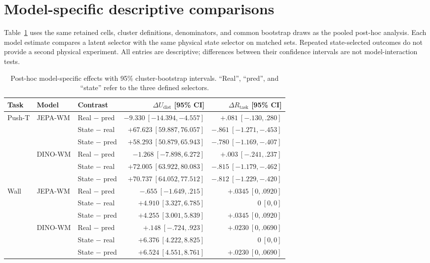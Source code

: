 \section{Model-specific descriptive comparisons}
\label{app:models}

Table~\ref{tab:models} uses the same retained cells, cluster definitions,
denominators, and common bootstrap draws as the pooled post-hoc analysis.
Each model estimate compares a latent selector with the same physical state
selector on matched sets. Repeated state-selected outcomes do not provide a
second physical experiment. All entries are descriptive; differences between
their confidence intervals are not model-interaction tests.

\begin{table}[h]
\caption{Post-hoc model-specific effects with 95\% cluster-bootstrap
intervals. ``Real'', ``pred'', and ``state'' refer to the three defined selectors.}
\label{tab:models}
\centering\small
\begin{tabular}{lllrr}
\toprule
Task & Model & Contrast & $\Delta U_{\mathrm{dist}}$ [95\% CI] & $\Delta R_{\mathrm{task}}$ [95\% CI]\\
\midrule
Push-T & JEPA-WM & Real $-$ pred & $-9.330\ [-14.394,-4.557]$ & $+.081\ [-.130,.280]$\\
 & & State $-$ real & $+67.623\ [59.887,76.057]$ & $-.861\ [-1.271,-.453]$\\
 & & State $-$ pred & $+58.293\ [50.879,65.943]$ & $-.780\ [-1.169,-.407]$\\
 & DINO-WM & Real $-$ pred & $-1.268\ [-7.898,6.272]$ & $+.003\ [-.241,.237]$\\
 & & State $-$ real & $+72.005\ [63.922,80.083]$ & $-.815\ [-1.179,-.462]$\\
 & & State $-$ pred & $+70.737\ [64.052,77.512]$ & $-.812\ [-1.229,-.420]$\\
\addlinespace
Wall & JEPA-WM & Real $-$ pred & $-.655\ [-1.649,.215]$ & $+.0345\ [0,.0920]$\\
 & & State $-$ real & $+4.910\ [3.327,6.785]$ & $0\ [0,0]$\\
 & & State $-$ pred & $+4.255\ [3.001,5.839]$ & $+.0345\ [0,.0920]$\\
 & DINO-WM & Real $-$ pred & $+.148\ [-.724,.923]$ & $+.0230\ [0,.0690]$\\
 & & State $-$ real & $+6.376\ [4.222,8.825]$ & $0\ [0,0]$\\
 & & State $-$ pred & $+6.524\ [4.551,8.761]$ & $+.0230\ [0,.0690]$\\
\bottomrule
\end{tabular}
\end{table}

